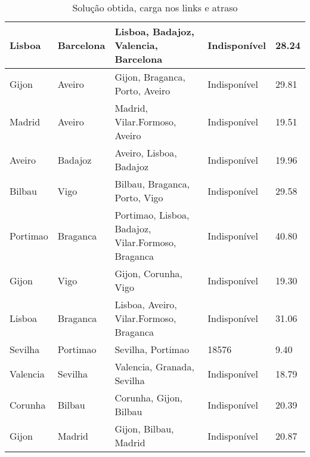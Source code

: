 \begin{table}[!htb]
{\begin{tabular}{|l|l|l|l|l|}
Lisboa & Barcelona & Lisboa, Badajoz, Valencia, Barcelona & Indisponível & 28.24 \\ \hline
Gijon & Aveiro & Gijon, Braganca, Porto, Aveiro & Indisponível & 29.81 \\ \hline
Madrid & Aveiro & Madrid, Vilar.Formoso, Aveiro & Indisponível & 19.51 \\ \hline
Aveiro & Badajoz & Aveiro, Lisboa, Badajoz & Indisponível & 19.96 \\ \hline
Bilbau & Vigo & Bilbau, Braganca, Porto, Vigo & Indisponível & 29.58 \\ \hline
Portimao & Braganca & Portimao, Lisboa, Badajoz, Vilar.Formoso, Braganca & Indisponível & 40.80 \\ \hline
Gijon & Vigo & Gijon, Corunha, Vigo & Indisponível & 19.30 \\ \hline
Lisboa & Braganca & Lisboa, Aveiro, Vilar.Formoso, Braganca & Indisponível & 31.06 \\ \hline
Sevilha & Portimao & Sevilha, Portimao & 18576 & 9.40 \\ \hline
Valencia & Sevilha & Valencia, Granada, Sevilha & Indisponível & 18.79 \\ \hline
Corunha & Bilbau & Corunha, Gijon, Bilbau & Indisponível & 20.39 \\ \hline
Gijon & Madrid & Gijon, Bilbau, Madrid & Indisponível & 20.87 \\ \hline
\end{tabular}}
\caption[]{Solução obtida, carga nos links e atraso}
\end{table}

